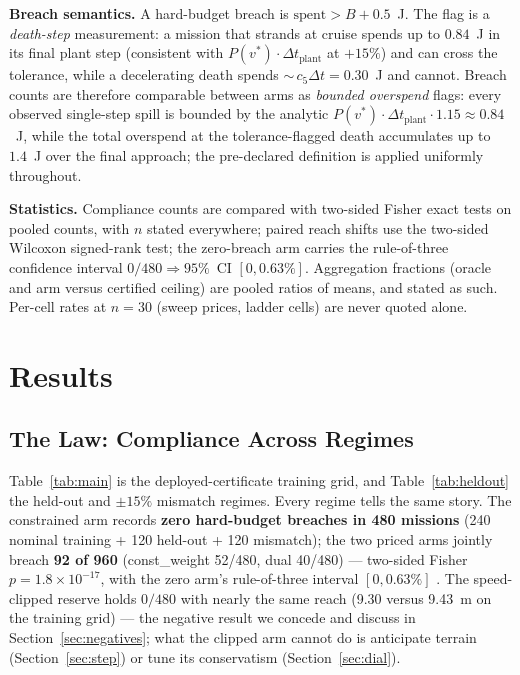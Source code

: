 \documentclass[preprint,12pt]{elsarticle}
\begin{document}
\textbf{Breach semantics.} A hard-budget breach is
$\text{spent} > B + 0.5$~J. The flag is a \emph{death-step}
measurement: a mission that strands at cruise spends up to
$0.84$~J in its final plant step (consistent with
$P(v^{*})\cdot\Delta t_{\mathrm{plant}}$ at $+15\%$) and can cross
the tolerance, while a decelerating death spends
${\sim}\,c_5 \Delta t = 0.30$~J and cannot.
 Breach counts are therefore comparable between arms as
\emph{bounded overspend} flags: every observed single-step spill is
bounded by the analytic $P(v^{*})\cdot\Delta t_{\mathrm{plant}}
\cdot 1.15 \approx 0.84$~J, while the total overspend at the
tolerance-flagged death accumulates up to $1.4$~J over the final
approach; the pre-declared definition is applied uniformly
throughout.

\textbf{Statistics.} Compliance counts are compared with two-sided
Fisher exact tests on pooled counts, with $n$ stated everywhere;
paired reach shifts use the two-sided Wilcoxon signed-rank test; the
zero-breach arm carries the rule-of-three confidence interval
$0/480 \Rightarrow 95\%$~CI $[0, 0.63\%]$.
 Aggregation fractions (oracle and arm versus certified ceiling) are
pooled ratios of means, and stated as such. Per-cell rates at $n=30$
(sweep prices, ladder cells) are never quoted alone.


\section{Results}
\label{sec:results}

\subsection{The Law: Compliance Across Regimes}
\label{sec:law}

Table~\ref{tab:main} is the deployed-certificate training grid, and
Table~\ref{tab:heldout} the held-out and $\pm 15\%$ mismatch regimes.
Every regime tells the same story. The constrained arm records
\textbf{zero hard-budget breaches in 480 missions} (240 nominal
training + 120 held-out + 120 mismatch); the two priced arms jointly
breach \textbf{92 of 960} (const\_weight 52/480, dual 40/480) ---
two-sided Fisher $p = 1.8\times10^{-17}$, with the zero arm's
rule-of-three interval $[0, 0.63\%]$
. The speed-clipped reserve holds $0/480$ with nearly the same reach
(9.30 versus 9.43~m on the training grid) --- the negative result we
concede and discuss in Section~\ref{sec:negatives}; what the clipped
arm cannot do is anticipate terrain
(Section~\ref{sec:step}) or tune its conservatism
(Section~\ref{sec:dial}).
\end{document}

